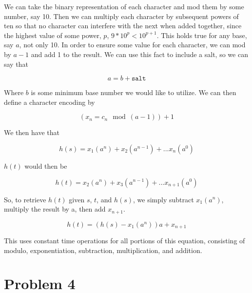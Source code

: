 \documentclass[answers, 12pt]{article}
\begin{document}
We can take the binary representation of each character and mod them by some number, say 10. Then we can multiply each character by subsequent powers of ten so that no character can interfere with the next when added together, since the highest value of some power, $p$, $9 * 10^p < 10^{p+1}$. This holds true for any base, say $a$, not only 10. In order to ensure some value for each character, we can mod by $a - 1$ and add 1 to the result. We can use this fact to include a salt, so we can say that 

\[
  a = b + \texttt{salt}
\]

Where $b$ is some minimum base number we would like to utilize. We can then define a character encoding by

\[
  (x_n = c_n \mod (a - 1)) + 1
\]

We then have that 

\[
  h(s) = x_1(a^n) + x_2(a^{n-1}) + ... x_n(a^0)
\] 

 $h(t)$ would then be 
 
 \[
  h(t) = x_2(a^{n}) + x_3(a^{n-1}) + ... x_{n+1}(a^0)
\]

So, to retrieve $h(t)$ given $s$, $t$, and $h(s)$, we simply subtract $x_1(a^n)$, multiply the result by a, then add $x_{n+1}$.

 \[
  h(t) = (h(s) - x_1(a^n))a + x_{n+1}
\]

This uses constant time operations for all portions of this equation, consisting of modulo, exponentiation, subtraction, multiplication, and addition.


\section*{Problem 4}
\end{document}
